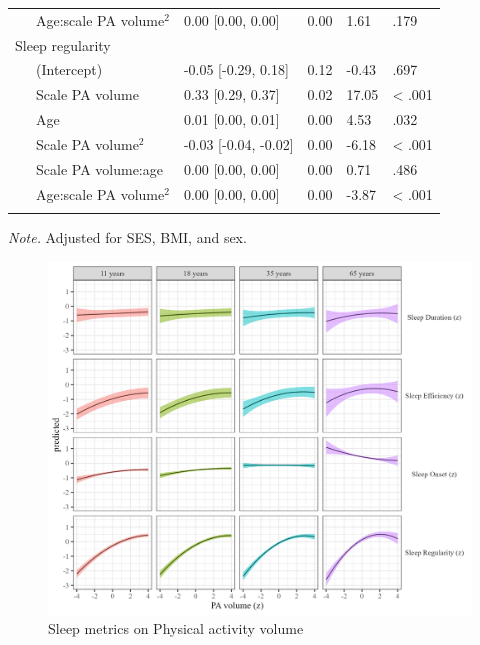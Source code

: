 \documentclass[
  man]{apa6}
\begin{document}
\begin{table}[tbp]
\begin{center}
\begin{threeparttable}
\begin{tabular}{lllll}
\ \ \ Age:scale PA volume$^2$ & 0.00 [0.00, 0.00] & 0.00 & 1.61 & .179\\
Sleep regularity &  &  &  & \\
\ \ \ (Intercept) & -0.05 [-0.29, 0.18] & 0.12 & -0.43 & .697\\
\ \ \ Scale PA volume & 0.33 [0.29, 0.37] & 0.02 & 17.05 & < .001\\
\ \ \ Age & 0.01 [0.00, 0.01] & 0.00 & 4.53 & .032\\
\ \ \ Scale PA volume$^2$ & -0.03 [-0.04, -0.02] & 0.00 & -6.18 & < .001\\
\ \ \ Scale PA volume:age & 0.00 [0.00, 0.00] & 0.00 & 0.71 & .486\\
\ \ \ Age:scale PA volume$^2$ & 0.00 [0.00, 0.00] & 0.00 & -3.87 & < .001\\
\bottomrule
\addlinespace
\end{tabular}

\begin{tablenotes}[para]
\normalsize{\textit{Note.} Adjusted for SES, BMI, and sex. }
\end{tablenotes}

\end{threeparttable}
\end{center}

\end{table}

\begin{figure}
\includegraphics[width=7.08in]{../Figures/sleep on pa_volume} \caption{Sleep metrics on Physical activity volume}\label{fig:sleep-by-volume-fig}
\end{figure}
\end{document}

